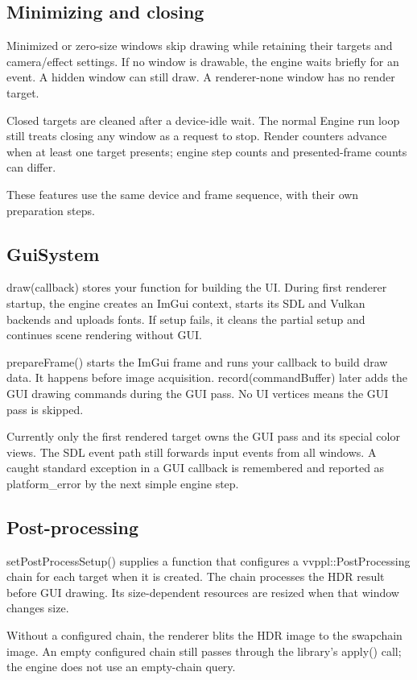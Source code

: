 \documentclass[11pt,a4paper]{article}
\begin{document}
\subsection*{Minimizing and closing}
Minimized or zero-size windows skip drawing while retaining their targets and camera/effect settings. If no window is drawable, the engine waits briefly for an event. A hidden window can still draw. A renderer-none window has no render target.

Closed targets are cleaned after a device-idle wait. The normal Engine run loop still treats closing any window as a request to stop. Render counters advance when at least one target presents; engine step counts and presented-frame counts can differ.

\label{core-44}
These features use the same device and frame sequence, with their own preparation steps.

\subsection*{GuiSystem}
draw(callback) stores your function for building the UI. During first renderer startup, the engine creates an ImGui context, starts its SDL and Vulkan backends and uploads fonts. If setup fails, it cleans the partial setup and continues scene rendering without GUI.

prepareFrame() starts the ImGui frame and runs your callback to build draw data. It happens before image acquisition. record(commandBuffer) later adds the GUI drawing commands during the GUI pass. No UI vertices means the GUI pass is skipped.

Currently only the first rendered target owns the GUI pass and its special color views. The SDL event path still forwards input events from all windows. A caught standard exception in a GUI callback is remembered and reported as platform\_error by the next simple engine step.

\subsection*{Post-processing}
setPostProcessSetup() supplies a function that configures a vvppl::PostProcessing chain for each target when it is created. The chain processes the HDR result before GUI drawing. Its size-dependent resources are resized when that window changes size.

Without a configured chain, the renderer blits the HDR image to the swapchain image. An empty configured chain still passes through the library's apply() call; the engine does not use an empty-chain query.
\end{document}
